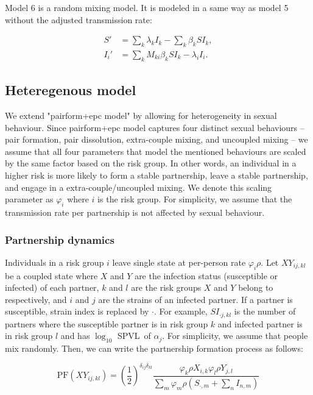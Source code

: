 \documentclass[10pt,letterpaper]{article}
\newcommand{\kkhalf}{\left(\frac{1}{2}\right)^{\delta_{ij} \delta_{kl}}}  %
\newcommand{\Lspvl}{$\log_{10}$ SPVL}
\newcommand{\PF}{\textrm{PF}}
\begin{document}
Model 6 is a random mixing model. It is modeled in a same way as model 5 without the adjusted transmission rate:

\begin{equation}
\begin{aligned}
S' & = \sum_k \lambda_k I_k - \sum_k \beta_k S I_k,\\
I_i' & = \sum_k M_{ki} \beta_k S I_k - \lambda_i I_i.
\end{aligned}
\end{equation}

\subsection*{Heteregenous model}

We extend "pairform+epc model" by allowing for heterogeneity in sexual behaviour. Since pairform+epc model captures four distinct sexual behaviours -- pair formation, pair dissolution, extra-couple mixing, and uncoupled mixing -- we assume that all four parameters that model the mentioned behaviours are scaled by the same factor based on the risk group. In other words, an individual in a higher risk is more likely to form a stable partnership, leave a stable partnership, and engage in a extra-couple/uncoupled mixing. We denote this scaling parameter as $\varphi_i$ where $i$ is the risk group. For simplicity, we assume that the transmission rate per partnership is not affected by sexual behaviour.

\subsubsection*{Partnership dynamics}

Individuals in a risk group $i$ leave single state at per-person rate $\varphi_i \rho$. Let $XY_{ij,kl}$ be a coupled state where $X$ and $Y$ are the infection status (susceptible or infected) of each partner, $k$ and $l$ are the risk groups $X$ and $Y$ belong to respectively, and $i$ and $j$ are the strains of an infected partner. If a partner is susceptible, strain index is replaced by $\cdot$. For example, $SI_{\cdot j,kl}$ is the number of partners where the susceptible partner is in risk group $k$ and infected partner is in risk group $l$ and has \Lspvl\ of $\alpha_j$. For simplicity, we assume that people mix randomly. Then, we can write the partnership formation process as follows:

\begin{equation}
\PF(XY_{ij, kl}) = \kkhalf \frac{\varphi_k \rho X_{i,k} \varphi_l \rho Y_{j, l}}{\sum\limits_m \varphi_m \rho (S_{\cdot, m} + \sum\limits_n I_{n,m})}
\end{equation}
\end{document}
